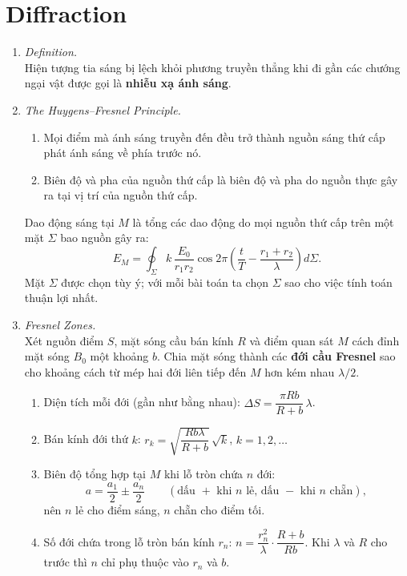 \section{Diffraction}
\begin{enumerate}
\item \textit{Definition.}\\
Hiện tượng tia sáng bị lệch khỏi phương truyền thẳng khi đi gần các chướng ngại vật được gọi là \textbf{nhiễu xạ ánh sáng}.

\item \textit{The Huygens--Fresnel Principle.}\\
\begin{enumerate}
  \item[(a)] Mọi điểm mà ánh sáng truyền đến đều trở thành nguồn sáng thứ cấp phát ánh sáng về phía trước nó.
  \item[(b)] Biên độ và pha của nguồn thứ cấp là biên độ và pha do nguồn thực gây ra tại vị trí của nguồn thứ cấp.
\end{enumerate}
Dao động sáng tại $M$ là tổng các dao động do mọi nguồn thứ cấp trên một mặt $\Sigma$ bao nguồn gây ra:
\[
E_M = \oint_\Sigma k\,\frac{E_0}{r_1 r_2}\cos 2\pi\left(\frac{t}{T} - \frac{r_1 + r_2}{\lambda}\right)d\Sigma.
\]
Mặt $\Sigma$ được chọn tùy ý; với mỗi bài toán ta chọn $\Sigma$ sao cho việc tính toán thuận lợi nhất.

\item \textit{Fresnel Zones.}\\
Xét nguồn điểm $S$, mặt sóng cầu bán kính $R$ và điểm quan sát $M$ cách đỉnh mặt sóng $B_0$ một khoảng $b$. Chia mặt sóng thành các \textbf{đới cầu Fresnel} sao cho khoảng cách từ mép hai đới liên tiếp đến $M$ hơn kém nhau $\lambda/2$.
\begin{enumerate}
  \item[(a)] Diện tích mỗi đới (gần như bằng nhau): $\Delta S = \dfrac{\pi R b}{R + b}\,\lambda$.
  \item[(b)] Bán kính đới thứ $k$: $r_k = \sqrt{\dfrac{Rb\lambda}{R + b}}\,\sqrt{k}$, $k = 1, 2, \dots$
  \item[(c)] Biên độ tổng hợp tại $M$ khi lỗ tròn chứa $n$ đới:
  \[
  a = \frac{a_1}{2} \pm \frac{a_n}{2} \qquad (\text{dấu } + \text{ khi } n \text{ lẻ, dấu } - \text{ khi } n \text{ chẵn}),
  \]
  nên $n$ lẻ cho điểm sáng, $n$ chẵn cho điểm tối.
  \item[(d)] Số đới chứa trong lỗ tròn bán kính $r_n$: $n = \dfrac{r_n^2}{\lambda}\cdot\dfrac{R + b}{Rb}$. Khi $\lambda$ và $R$ cho trước thì $n$ chỉ phụ thuộc vào $r_n$ và $b$.
\end{enumerate}


\end{enumerate}
